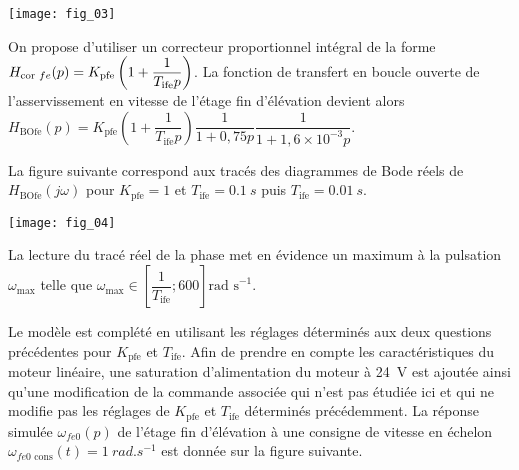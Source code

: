 \begin{marginfigure}
\texttt{[image: fig\_03]}
\end{marginfigure}


On propose d’utiliser un correcteur proportionnel intégral de la forme $H_{\text{cor }fe}(p)=K_{\text{\text{pfe}}}\left(1+\dfrac{1}{T_{\text{ife}}p}\right)$. La fonction de transfert en boucle ouverte de l’asservissement en vitesse de l’étage fin d’élévation devient alors 
$
H_{\text{BOfe}}(p)=K_{\text{pfe}}\left( 1+\dfrac{1}{T_{\text{ife}}p}\right) \dfrac{1}{1+0,75p} \dfrac{1}{1+1,6\times 10^{-3}p}
$.

La figure suivante correspond aux tracés des diagrammes de Bode réels de $H_{\text{BOfe}}(j\omega)$ 
pour $K_{\text{pfe}}=1$ et $T_{\text{ife}}=\SI{0,1}{s}$ puis $T_{\text{ife}}=\SI{0,01}{s}$.


\begin{marginfigure}
\texttt{[image: fig\_04]}
\end{marginfigure}


\ifprof
\begin{corrige}
\end{corrige}
\else
\fi

La lecture du tracé réel de la phase met en évidence un maximum à la pulsation $\omega_{\text{max}}$ telle que $\omega_{\text{max}}\in \left[\dfrac{1}{T_{\text{ife}}};600 \right]\text{rad s}^{-1}$.

\ifprof
\begin{corrige}
\end{corrige}
\else
\fi

\ifprof
\begin{corrige}
\end{corrige}
\else
\fi


Le modèle est complété en utilisant les réglages déterminés aux deux questions précédentes pour $K_{\text{pfe}}$ et $T_{\text{ife}}$. Afin de
prendre en compte les caractéristiques du moteur linéaire, une saturation d’alimentation du moteur à \SI{24}{V} est
ajoutée ainsi qu’une modification de la commande associée qui n’est pas étudiée ici et qui ne modifie pas les
réglages de $K_{\text{pfe}}$ et $T_{\text{ife}}$ déterminés précédemment. La réponse simulée $\omega_{fe0}(p)$ de l’étage fin d’élévation à une
consigne de vitesse en échelon $\omega_{fe0 \text{ cons}}(t) = \SI{1}{rad.s^{-1}}$ est donnée sur la figure suivante.

